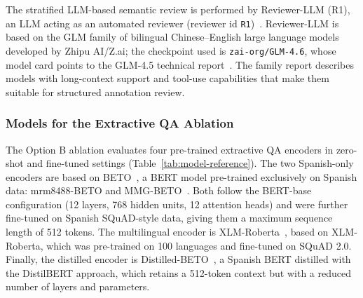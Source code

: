 \documentclass[graybox]{SNmult}
\begin{document}
The stratified LLM-based semantic review is performed by Reviewer-LLM (R1), an
LLM acting as an automated reviewer (reviewer id \texttt{R1})~\cite{glm45_techreport,glm_reviewer_hf,zeng2024chatglm}.
Reviewer-LLM is based on the GLM family of bilingual Chinese--English large
language models developed by Zhipu AI/Z.ai; the checkpoint used is
\texttt{zai-org/GLM-4.6}, whose model card points to the GLM-4.5 technical
report~\cite{glm45_techreport}. The family report describes models with
long-context support and tool-use capabilities that make them suitable for
structured annotation review.

\subsubsection{Models for the Extractive QA Ablation}
\label{sec:models-ablation}

The Option B ablation evaluates four pre-trained extractive QA encoders in
zero-shot and fine-tuned settings (Table~\ref{tab:model-reference}). The two
Spanish-only encoders are based on BETO~\cite{CaneteCFP2020}, a BERT model
pre-trained exclusively on Spanish data: mrm8488-BETO and
MMG-BETO~\cite{mrm8488_beto_squad2_hf,mmg_beto_squad2_hf}. Both follow the
BERT-base configuration (12 layers, 768 hidden units, 12 attention heads) and
were further fine-tuned on Spanish SQuAD-style data, giving them a maximum
sequence length of 512 tokens. The multilingual encoder is
XLM-Roberta~\cite{xlmr_squad2_hf,conneau2020xlmr}, based on XLM-Roberta, which
was pre-trained on 100 languages and fine-tuned on SQuAD 2.0. Finally, the
distilled encoder is Distilled-BETO~\cite{distill_beto_squad2_hf,sanh2019distilbert},
a Spanish BERT distilled with the DistilBERT approach, which retains a
512-token context but with a reduced number of layers and parameters.
\end{document}
